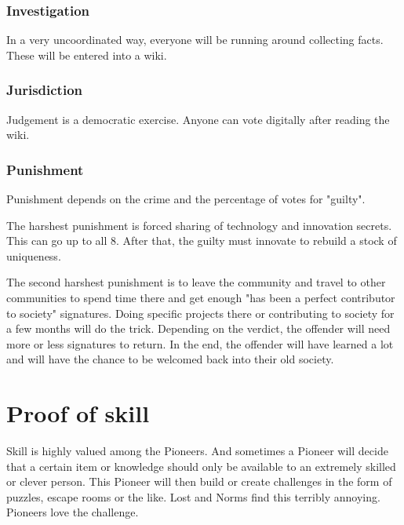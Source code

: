 \subsubsection{Investigation}

In a very uncoordinated way, everyone will be running around collecting facts. These will be entered into a wiki.

\subsubsection{Jurisdiction}

Judgement is a democratic exercise. Anyone can vote digitally after reading the wiki.

\subsubsection{Punishment}

Punishment depends on the crime and the percentage of votes for "guilty".

The harshest punishment is forced sharing of technology and innovation secrets. This can go up to all 8. After that, the guilty must innovate to rebuild a stock of uniqueness.

The second harshest punishment is to leave the community and travel to other communities to spend time there and get enough "has been a perfect contributor to society" signatures. Doing specific projects there or contributing to society for a few months will do the trick. Depending on the verdict, the offender will need more or less signatures to return. In the end, the offender will have learned a lot and will have the chance to be welcomed back into their old society.

\section{Proof of skill}

Skill is highly valued among the Pioneers. And sometimes a Pioneer will decide that a certain item or knowledge should only be available to an extremely skilled or clever person.
This Pioneer will then build or create challenges in the form of puzzles, escape rooms or the like.
Lost and Norms find this terribly annoying.
Pioneers love the challenge.

